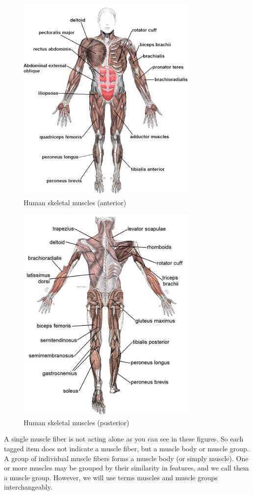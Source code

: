 \documentclass[master,english,final]{kaist-ucs}
\begin{document}
\begin{figure}[h!]
  \centering
  \includegraphics[width=3.5in]{muscles_anterior_labeled}
  \caption{Human skeletal muscles (anterior)}
  \label{skelmus1}
\end{figure}

\begin{figure}[h!]
  \centering
  \includegraphics[width=3.5in]{Muscle_posterior_labeled}
  \caption{Human skeletal muscles (posterior)}
  \label{skelmus2}
\end{figure}
\noindent
A single muscle fiber is not acting alone as you can see in these figures.
So each tagged item does not indicate a muscle fiber, but a muscle body or muscle group.
A group of individual muscle fibers forms a muscle body (or simply muscle).
One or more muscles may be grouped by their similarity in features, and we call them a muscle group.
However, we will use terms muscles and muscle groups interchangeably.
\end{document}
